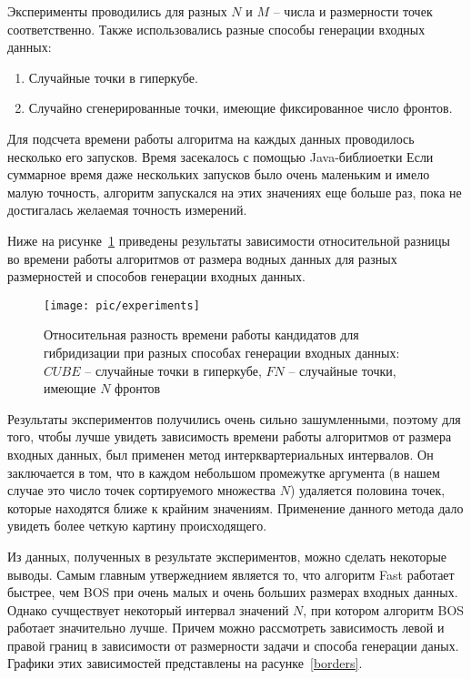 Эксперименты проводились для разных $N$ и $M$ -- числа и размерности точек соответственно. Также использовались
разные способы генерации входных данных:

\begin{enumerate}
 \item Случайные точки в гиперкубе.
 \item Случайно сгенерированные точки, имеющие фиксированное число фронтов.
\end{enumerate}

Для подсчета времени работы алгоритма на каждых данных проводилось несколько его запусков. Время засекалось с помощью
Java-библиоетки %
Если суммарное время даже нескольких запусков было очень маленьким и имело малую точность, алгоритм запускался на
этих значениях еще больше раз, пока не достигалась желаемая точность измерений.

Ниже на рисунке~\ref{experiment} приведены результаты зависимости относительной разницы во времени работы алгоритмов
от размера водных данных для разных размерностей и способов генерации входных данных.


\begin{figure}
\begin{center}
\texttt{[image: pic/experiments]}
\caption{Относительная разность времени работы кандидатов для гибридизации при разных способах генерации входных
данных: $CUBE$ -- случайные точки в гиперкубе, $FN$ -- случайные точки, имеющие $N$ фронтов}
\label{experiment}
\end{center}
\end{figure}

Результаты экспериментов получились очень сильно зашумленными, поэтому для того, чтобы лучше увидеть зависимость
времени работы алгоритмов от размера входных данных, был применен метод интерквартериальных интервалов. Он
заключается в том, что в каждом небольшом промежутке аргумента (в нашем случае это число точек сортируемого
множества $N$) удаляется половина точек, которые находятся ближе к крайним значениям. Применение данного метода
дало увидеть более четкую картину происходящего.

Из данных, полученных в результате экспериментов, можно сделать некоторые выводы. Самым главным утвержеднием
является то, что алгоритм Fast работает быстрее, чем BOS при очень малых и очень больших размерах входных данных.
Однако сучществует некоторый интервал значений $N$, при котором алгоритм BOS работает значительно лучше. Причем
можно рассмотреть зависимость левой и правой границ в зависимости от размерности задачи и способа генерации даных.
Графики этих зависимостей представлены на расунке~\ref{borders}.

